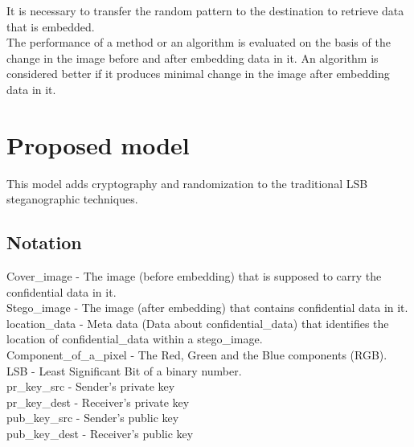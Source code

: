 \documentclass[conference]{IEEEtran}
\begin{document}
It is necessary to transfer the random pattern to the destination to retrieve data that is embedded. \\


The performance of a method or an algorithm is evaluated on the basis of the change in the image before and after embedding data in it.
An algorithm is considered better if it produces minimal change in the image after embedding data in it.\\

\section{Proposed model}
This model adds cryptography and randomization to the traditional LSB steganographic techniques.
\\
\subsection{Notation}
Cover\_image - The image (before embedding) that is supposed to carry the confidential data in it. \\

Stego\_image - The image (after embedding) that contains confidential data in it. \\

location\_data - Meta data (Data about confidential\_data) that identifies the location of confidential\_data within a stego\_image. \\

Component\_of\_a\_pixel - The Red, Green and the Blue components (RGB). \\

LSB - Least Significant Bit of a binary number. \\

pr\_key\_src - Sender's private key \\

pr\_key\_dest - Receiver's private key \\

pub\_key\_src - Sender's public key \\

pub\_key\_dest - Receiver's public key \\
\end{document}
